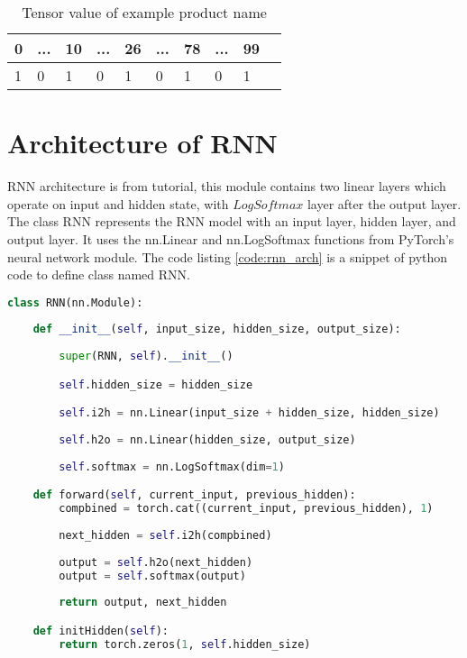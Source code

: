 \begin{table}[htp!]
    \centering
    \caption{Tensor value of example product name}
    \label{table:tensorvalue}
    \begin{tabular}{ llllllllll }
          \toprule
          
          \textbf{0} & \textbf{...}& \textbf{10}&\textbf{...}&\textbf{26}&\textbf{...}&\textbf{78}&\textbf{...}&\textbf{99}\\
          \midrule
          1 & 0& 1& 0&1& 0& 1 & 0& 1\\
                 
        
          \bottomrule
          \end{tabular}
\end{table}

\section{Architecture of \acf{RNN}}
\acs{RNN} architecture is from \parencite{sean} tutorial, this module contains two linear layers which operate on input and hidden state, with $LogSoftmax$ layer after the output layer. The class RNN represents the RNN model with an input layer, hidden layer, and output layer. It uses the nn.Linear and nn.LogSoftmax functions from PyTorch's neural network module.  The code listing \ref{code:rnn_arch} is a snippet of python code to define class named RNN.

\begin{lstlisting}[language=Python,label=code:RNN-class, caption={\acf{RNN} class}, label={code:rnn_arch}]
class RNN(nn.Module):
        
    def __init__(self, input_size, hidden_size, output_size):
        
        super(RNN, self).__init__()

        self.hidden_size = hidden_size

        self.i2h = nn.Linear(input_size + hidden_size, hidden_size)
        
        self.h2o = nn.Linear(hidden_size, output_size)
        
        self.softmax = nn.LogSoftmax(dim=1)

    def forward(self, current_input, previous_hidden):
        compbined = torch.cat((current_input, previous_hidden), 1)
        
        next_hidden = self.i2h(compbined)
        
        output = self.h2o(next_hidden)
        output = self.softmax(output)
        
        return output, next_hidden

    def initHidden(self):
        return torch.zeros(1, self.hidden_size)
\end{lstlisting}

